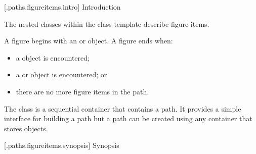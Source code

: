 
 [\iotwod.paths.figureitems.intro] {Introduction}

\pnum
The nested classes within the class template  describe figure items.

\pnum
A figure begins with an  or  object. A figure ends when:

\begin{itemize}
\item a  object is encountered;
\item a  or  object is encountered; or
\item there are no more figure items in the path.
\end{itemize}

\pnum
The  class is a sequential container that contains a path. It provides a simple interface for building a path but a path can be created using any container that stores  objects.

 [\iotwod.paths.figureitems.synopsis] {Synopsis}

